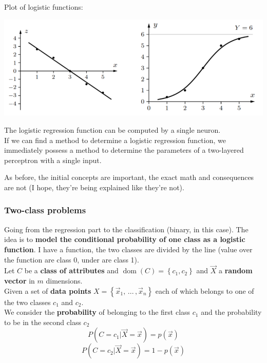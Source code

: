 \documentclass[11pt]{article}
\DeclareMathOperator*{\dom}{dom}
\begin{document}
		Plot of logistic functions: 
		\begin{center}
			\includegraphics[width=0.9\columnwidth]{img/NN/logreg3}
		\end{center}
		The logistic regression function can be computed by a single neuron.\\
		
		If we can find a method to determine a logistic regression function, we immediately possess a method to determine the parameters of a two-layered perceptron with a single input.\\
		
		\vfill
		
		As before, the initial concepts are important, the exact math and consequences are not (I hope, they're being explained like they're not).
		
		\newpage
		
		\subsubsection{Two-class problems}
		Going from the regression part to the classification (binary, in this case). The idea is to \textbf{model the conditional probability of one class as a logistic function}. I have a function, the two classes are divided by the line (value over the function are class 0, under are class 1).\\
		
		Let $C$ be a \textbf{class of attributes} and $\dom (C) = \left\{c_1, c_2\right\}$ and $\vec{X}$ a \textbf{random vector} in $m$ dimensions.\\
		
		Given a set of \textbf{data points} $X = \left\{\vec{x}_1 , \, ... \, , \vec{x}_n \right\}$ each of which belongs to one of the two classes $c_1$ and $c_2$.\\
		
		We consider the \textbf{probability} of belonging to the first class $c_1$ and the probability to be in the second class $c_2$
		$$ P (C = c_1 | \vec{X} = \vec{x}) = p(\vec{x}) $$
		$$ P (C = c_2 | \vec{X} = \vec{x}) = 1 - p(\vec{x}) $$
		
\end{document}
